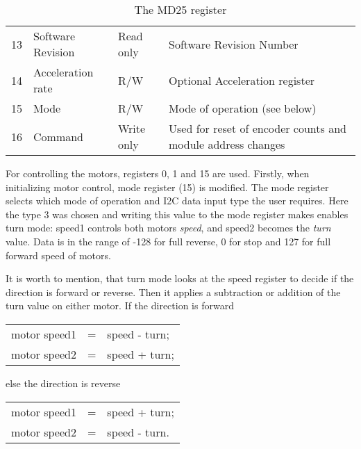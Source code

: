 \documentclass[11pt]{article}
\begin{document}
\begin{table}[h]
\begin{tabular}{@{}llll@{}}
		13                & Software Revision & Read only           & Software Revision Number                                         \\
		14                & Acceleration rate & R/W                 & Optional Acceleration register                                   \\
		15                & Mode              & R/W                 & Mode of operation (see below)                                    \\
		16                & Command           & Write only          & Used for reset of encoder counts and module address changes      \\ \bottomrule
	\end{tabular}
	\caption{The MD25 register}
\end{table}

For controlling the motors, registers 0, 1 and 15 are used. Firstly, when initializing motor control, mode register (15) is modified.
The mode register selects which mode of operation and I2C data input type the user requires. Here the type 3 was chosen and writing this value 
to the mode register makes enables turn mode: speed1 controls both motors \textit{speed}, and speed2 becomes the \textit{turn} value. 
Data is in the range of -128 for full reverse, 0 for stop and 127 for full forward speed of motors.

It is worth to mention, that turn mode looks at the speed register to decide if the direction is forward or reverse. Then it applies a subtraction or addition of the turn value on either motor. If the direction is forward
\begin{table}[!ht]
	\centering
	\begin{tabular}{lcl}
		motor speed1 & = & speed - turn;\\
		motor speed2 & = & speed + turn;
	\end{tabular}
\end{table}

else the direction is reverse 
\begin{table}[!ht]
	\centering
	\begin{tabular}{lcl}
		motor speed1 & = & speed + turn;\\
		motor speed2 & = & speed - turn.
	\end{tabular}
\end{table}
\end{document}
